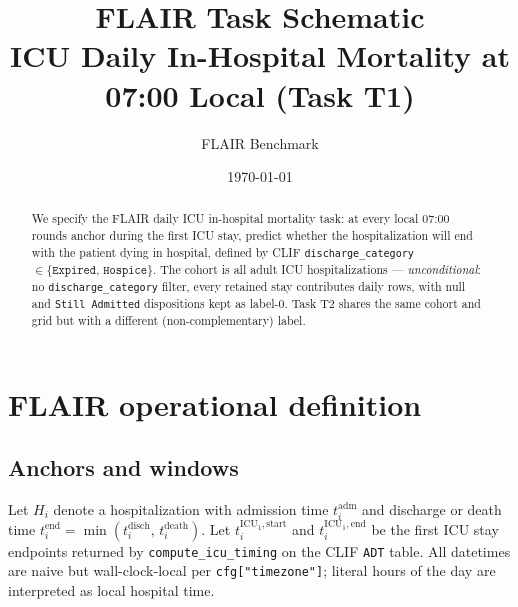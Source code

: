 \documentclass[11pt]{article}
\title{\textbf{FLAIR Task Schematic} \\[0.3em]
       ICU Daily In-Hospital Mortality at 07:00 Local (Task T1)}
\author{FLAIR Benchmark}
\date{\today}
\begin{document}
\maketitle

\begin{abstract}
\noindent We specify the FLAIR daily ICU in-hospital mortality task:
at every local 07:00 rounds anchor during the first ICU stay, predict
whether the hospitalization will end with the patient dying in hospital,
defined by CLIF \texttt{discharge\_category} $\in
\{\texttt{Expired},\,\texttt{Hospice}\}$. The cohort is all adult ICU
hospitalizations --- \textit{unconditional}: no \texttt{discharge\_category}
filter, every retained stay contributes daily rows, with null and
\texttt{Still Admitted} dispositions kept as label-0. Task T2 shares
the same cohort and grid but with a different (non-complementary)
label.
\end{abstract}

\section{FLAIR operational definition}
\label{sec:def}

\subsection{Anchors and windows}

Let $H_i$ denote a hospitalization with admission time
$t^{\text{adm}}_i$ and discharge or death time $t^{\text{end}}_i =
\min(t^{\text{disch}}_i,\, t^{\text{death}}_i)$. Let
$t^{\text{ICU}_1,\text{start}}_i$ and $t^{\text{ICU}_1,\text{end}}_i$
be the first ICU stay endpoints returned by \verb|compute_icu_timing|
on the CLIF \texttt{ADT} table. All datetimes are naive but
wall-clock-local per \texttt{cfg["timezone"]}; literal hours of the
day are interpreted as local hospital time.
\end{document}
